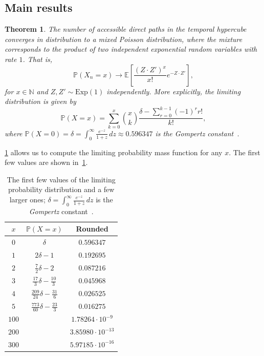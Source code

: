 \documentclass[11pt]{article}
\newtheorem{theorem}{Theorem}
\theoremstyle{definition}
\theoremstyle{remark}
\theoremstyle{remark}
\numberwithin{theorem}{section}
\providecommand{\P}{}
\renewcommand{\P}{\mathbb{P}}
\let\savehline\hline
\def\hline{\noalign{\vskip0pt}\savehline\noalign{\vskip0pt}}
\begin{document}
\subsection{Main results}

\begin{theorem}\label{thm:main}
    The number of accessible direct paths in the temporal hypercube converges in distribution to a mixed Poisson distribution, where the mixture corresponds to the product of two independent exponential random variables with rate $1$. That is,
    \[
    \P(X_n=x)\to\mathbb{E}\left[\frac{(Z\cdot Z')^x}{x!}e^{-Z\cdot Z'}\right],
    \]
    for $x\in\mathbb{N}$ and $Z,Z'\sim\text{Exp}(1)$ independently.
    More explicitly, the limiting distribution is given by
    \begin{equation}\label{eq:gompertz-expression}
    \P(X=x)=\sum_{k=0}^x{x\choose k}\frac{\delta-\sum_{r=0}^{k-1}(-1)^rr!}{k!},
    \end{equation}
    where $\P(X=0)=\delta=\int_{0}^{\infty}\frac{e^{-z}}{1+z}\,dz \approx 0.596347$ is the \emph{Gompertz} constant~\citep{gompertz1825mortality}.
\end{theorem}

\cref{thm:main} allows us to compute the limiting probability mass function for any $x$. The first few values are shown in~\cref{tab:pmf}.

\begin{table}[]
    \centering
    \begin{tabular}{c|c|c}
    $x$     &  $\P(X=x)$ & Rounded\\ \savehline
    $0$     & $\delta$ & $0.596347$ \\
    $1$     & $2\delta-1$ & $0.192695$ \\
    $2$     & $\frac72\delta-2$ & $0.087216$ \\
    $3$     & $\frac{17}3\delta-\frac{10}{3}$ & $0.045968$ \\
    $4$     & $\frac{209}{24}\delta-\frac{31}{6}$ & $0.026525$ \\
    $5$     & $\frac{773}{60}\delta-\frac{23}{3}$ & $0.016275$ \\
    $100$     &  & $1.78264 \cdot 10^{-9}$ \\
    $200$     &  & $3.85980 \cdot 10^{-13}$ \\
    $300$     &  & $5.97185 \cdot 10^{-16}$ \\
    \end{tabular}
    \caption{The first few values of the limiting probability distribution and a few larger ones; $\delta=\int_{0}^{\infty}\frac{e^{-z}}{1+z}\,dz$ is the \emph{Gompertz} constant~\citep{gompertz1825mortality}.}
    \label{tab:pmf}
\end{table}
\end{document}

